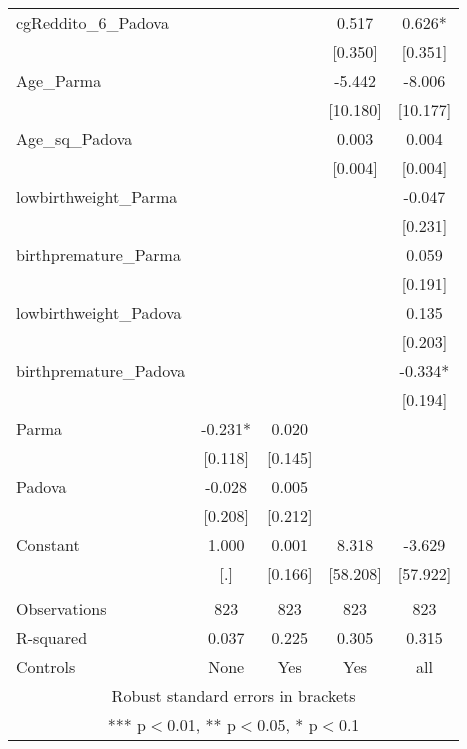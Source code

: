 \documentclass[]{article}
\begin{document}
\begin{tabular}{lcccc}
cgReddito\_6\_Padova &  &  & 0.517 & 0.626* \\
 &  &  & [0.350] & [0.351] \\
Age\_Parma &  &  & -5.442 & -8.006 \\
 &  &  & [10.180] & [10.177] \\
Age\_sq\_Padova &  &  & 0.003 & 0.004 \\
 &  &  & [0.004] & [0.004] \\
lowbirthweight\_Parma &  &  &  & -0.047 \\
 &  &  &  & [0.231] \\
birthpremature\_Parma &  &  &  & 0.059 \\
 &  &  &  & [0.191] \\
lowbirthweight\_Padova &  &  &  & 0.135 \\
 &  &  &  & [0.203] \\
birthpremature\_Padova &  &  &  & -0.334* \\
 &  &  &  & [0.194] \\
Parma & -0.231* & 0.020 &  &  \\
 & [0.118] & [0.145] &  &  \\
Padova & -0.028 & 0.005 &  &  \\
 & [0.208] & [0.212] &  &  \\
Constant & 1.000 & 0.001 & 8.318 & -3.629 \\
 & [.] & [0.166] & [58.208] & [57.922] \\
 &  &  &  &  \\
Observations & 823 & 823 & 823 & 823 \\
R-squared & 0.037 & 0.225 & 0.305 & 0.315 \\
 Controls & None & Yes & Yes & all \\ \hline
\multicolumn{5}{c}{ Robust standard errors in brackets} \\
\multicolumn{5}{c}{ *** p$<$0.01, ** p$<$0.05, * p$<$0.1} \\
\end{tabular}
\end{document}
